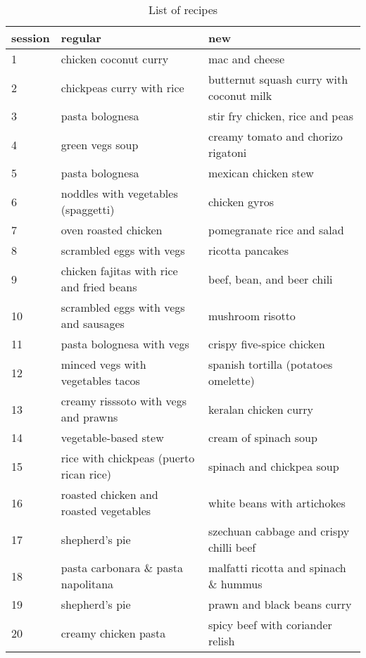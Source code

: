 \documentclass[]{article}
\begin{document}
\begin{table}

\caption{\label{tab:unnamed-chunk-2}List of recipes}
\centering
\begin{tabular}[t]{l|l|l}
\hline
session & regular & new\\
\hline
\rowcolor{gray!6}  1 & chicken coconut curry & mac and cheese\\
\hline
2 & chickpeas curry with rice & butternut squash curry with coconut milk\\
\hline
\rowcolor{gray!6}  3 & pasta bolognesa & stir fry chicken, rice and peas\\
\hline
4 & green vegs soup & creamy tomato and chorizo rigatoni\\
\hline
\rowcolor{gray!6}  5 & pasta bolognesa & mexican chicken stew\\
\hline
6 & noddles with vegetables (spaggetti) & chicken gyros\\
\hline
\rowcolor{gray!6}  7 & oven roasted chicken & pomegranate rice and salad\\
\hline
8 & scrambled eggs with vegs & ricotta pancakes\\
\hline
\rowcolor{gray!6}  9 & chicken fajitas with rice and fried beans & beef, bean, and beer chili\\
\hline
10 & scrambled eggs with vegs and sausages & mushroom risotto\\
\hline
\rowcolor{gray!6}  11 & pasta bolognesa with vegs & crispy five-spice chicken\\
\hline
12 & minced vegs with vegetables tacos & spanish tortilla (potatoes omelette)\\
\hline
\rowcolor{gray!6}  13 & creamy risssoto with vegs and prawns & keralan chicken curry\\
\hline
14 & vegetable-based stew & cream of spinach soup\\
\hline
\rowcolor{gray!6}  15 & rice with chickpeas (puerto rican rice) & spinach and chickpea soup\\
\hline
16 & roasted chicken and roasted vegetables & white beans with artichokes\\
\hline
\rowcolor{gray!6}  17 & shepherd's pie & szechuan cabbage and crispy chilli beef\\
\hline
18 & pasta carbonara \& pasta napolitana & malfatti ricotta and spinach \& hummus\\
\hline
\rowcolor{gray!6}  19 & shepherd's pie & prawn and black beans curry\\
\hline
20 & creamy chicken pasta & spicy beef with coriander relish\\
\hline
\end{tabular}
\end{table}
\end{document}
